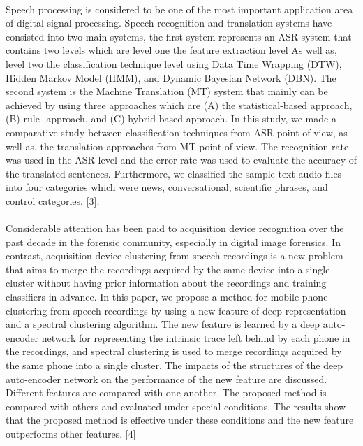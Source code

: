 \paragraph{}Speech processing is considered to be one of the most important application area of digital signal processing. Speech recognition and translation systems have consisted into two main systems, the first system represents an ASR system that contains two levels which are level one the feature extraction level As well as, level two the classification technique level using Data Time Wrapping (DTW), Hidden Markov Model (HMM), and Dynamic Bayesian Network (DBN). The second system is the Machine Translation (MT) system that mainly can be achieved by using three approaches which are (A) the statistical-based
approach, (B) rule -approach, and (C) hybrid-based approach. In this study, we made a comparative study between
classification techniques from ASR point of view, as well as, the translation approaches from MT point of view. The recognition rate was used in the ASR level and the error rate was used to evaluate the accuracy of the translated sentences. Furthermore, we classified the sample text audio files into four categories which were news, conversational, scientific phrases, and control categories.
 [3].

\paragraph{}Considerable attention has been paid to acquisition device recognition over the past decade in the forensic community, especially in digital image forensics. In contrast, acquisition device clustering from speech recordings is a new problem that aims to merge the recordings acquired by the same device into a single cluster without having prior information about the recordings and training classifiers in advance. In this paper, we propose a method for mobile phone clustering from speech recordings by using a new feature of deep representation and a spectral clustering algorithm. The new feature is learned by a deep auto-encoder network for representing the intrinsic trace left behind by each phone in the recordings, and spectral clustering is used to merge recordings acquired by the same phone into a single cluster. The impacts of the structures of the deep auto-encoder network on the performance of the new feature are discussed. Different features are compared with one another. The proposed method is compared with others and evaluated under special conditions. The results show that the proposed method is effective under these conditions and the new feature outperforms other features. [4]

